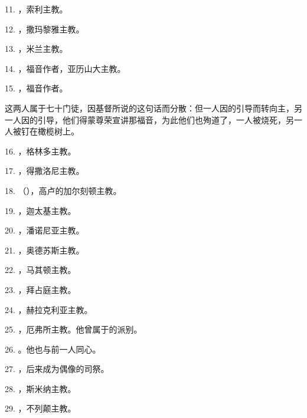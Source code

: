 11. ，索利主教。\par

12. ，撒玛黎雅主教。\par

13. ，米兰主教。\par

14. ，福音作者，亚历山大主教。\par

15. ，福音作者。\par

这两人属于七十门徒，因基督所说的这句话而分散：但一人因的引导而转向主，另一人因的引导，他们得蒙尊荣宣讲那福音，为此他们也殉道了，一人被烧死，另一人被钉在橄榄树上。\par

16. ，格林多主教。\par

17. ，得撒洛尼主教。\par

18. （），高卢的加尔刻顿主教。\par

19. ，迦太基主教。\par

20. ，潘诺尼亚主教。\par

21. ，奥德苏斯主教。\par

22. ，马其顿主教。\par

23. ，拜占庭主教。\par

24. ，赫拉克利亚主教。\par

25. ，厄弗所主教。他曾属于的派别。\par

26. 。他也与前一人同心。\par

27. ，后来成为偶像的司祭。\par

28. ，斯米纳主教。\par

29. ，不列颠主教。\par

